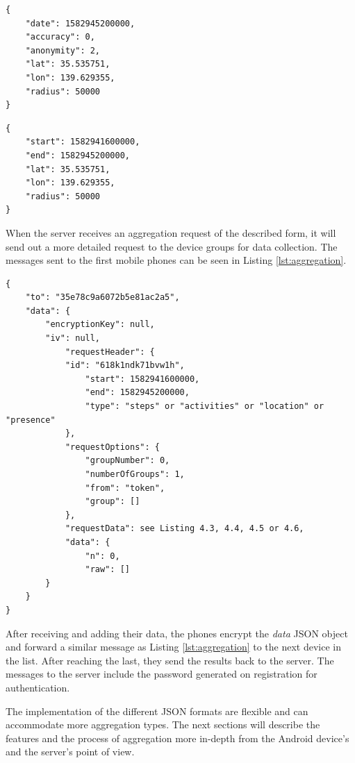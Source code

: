 \begin{lstlisting}[caption=Search options of an HTTP request for location data, label={lst:locations}]
{
    "date": 1582945200000,
    "accuracy": 0,
    "anonymity": 2,
    "lat": 35.535751,
    "lon": 139.629355,
    "radius": 50000
}
\end{lstlisting}

\begin{lstlisting}[caption=Search options of an HTTP request for presence data, label={lst:presence}]
{
    "start": 1582941600000,
    "end": 1582945200000,
    "lat": 35.535751,
    "lon": 139.629355,
    "radius": 50000
}
\end{lstlisting}


When the server receives an aggregation request of the described form, it will send out a more detailed request to the device groups for data collection. The messages sent to the first mobile phones can be seen in Listing \ref{lst:aggregation}.

\begin{lstlisting}[caption=Body of an HTTP request starting a new aggregation with the devices., label={lst:aggregation}]
{
    "to": "35e78c9a6072b5e81ac2a5",
    "data": {
        "encryptionKey": null,
        "iv": null,
            "requestHeader": {
            "id": "618k1ndk71bvw1h",
                "start": 1582941600000,
                "end": 1582945200000,
                "type": "steps" or "activities" or "location" or "presence"
            },
            "requestOptions": {
                "groupNumber": 0,
                "numberOfGroups": 1,
                "from": "token",
                "group": []
            },
            "requestData": see Listing 4.3, 4.4, 4.5 or 4.6,
            "data": {
                "n": 0,
                "raw": []
        }
    }
}
\end{lstlisting}

After receiving and adding their data, the phones encrypt the \textit{data} JSON object and forward a similar message as Listing \ref{lst:aggregation} to the next device in the list. After reaching the last, they send the results back to the server. The messages to the server include the password generated on registration for authentication.

The implementation of the different JSON formats are flexible and can accommodate more aggregation types. The next sections will describe the features and the process of aggregation more in-depth from the Android device's and the server's point of view.

